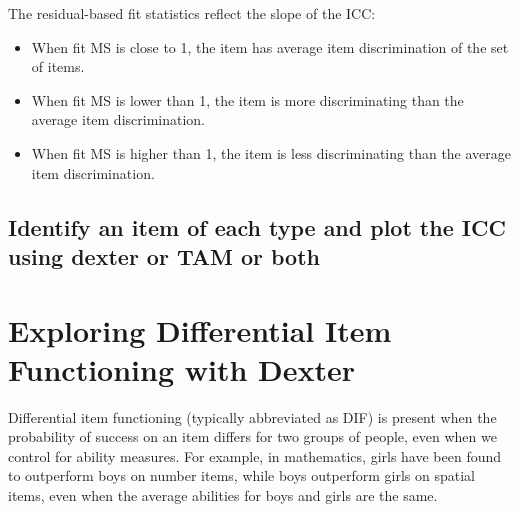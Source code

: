 \documentclass[
  letterpaper,
  DIV=11,
  numbers=noendperiod]{scrreprt}
\begin{document}
The residual-based fit statistics reflect the slope of the ICC:

\begin{itemize}
\item
  When fit MS is close to 1, the item has average item discrimination of
  the set of items.
\item
  When fit MS is lower than 1, the item is more discriminating than the
  average item discrimination.
\item
  When fit MS is higher than 1, the item is less discriminating than the
  average item discrimination.
\end{itemize}

\hypertarget{identify-an-item-of-each-type-and-plot-the-icc-using-dexter-or-tam-or-both}{%
\section{Identify an item of each type and plot the ICC using dexter or
TAM or
both}\label{identify-an-item-of-each-type-and-plot-the-icc-using-dexter-or-tam-or-both}}

\hypertarget{exploring-differential-item-functioning-with-dexter}{%
\chapter{Exploring Differential Item Functioning with
Dexter}\label{exploring-differential-item-functioning-with-dexter}}

Differential item functioning (typically abbreviated as DIF) is present
when the probability of success on an item differs for two groups of
people, even when we control for ability measures. For example, in
mathematics, girls have been found to outperform boys on number items,
while boys outperform girls on spatial items, even when the average
abilities for boys and girls are the same.
\end{document}
